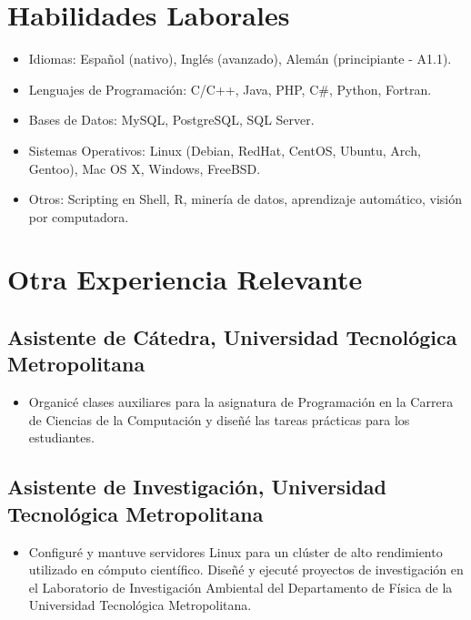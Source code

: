 \documentclass[a4paper,10pt]{article}
\begin{document}
\section*{Habilidades Laborales}
\begin{itemize}[left=0em]
    \item Idiomas: Español (nativo), Inglés (avanzado), Alemán (principiante - A1.1).
    \item Lenguajes de Programación: C/C++, Java, PHP, C#, Python, Fortran.
    \item Bases de Datos: MySQL, PostgreSQL, SQL Server.
    \item Sistemas Operativos: Linux (Debian, RedHat, CentOS, Ubuntu, Arch, Gentoo), Mac OS X, Windows, FreeBSD.
    \item Otros: Scripting en Shell, R, minería de datos, aprendizaje automático, visión por computadora.
\end{itemize}

\section*{Otra Experiencia Relevante}
\subsection*{Asistente de Cátedra, Universidad Tecnológica Metropolitana}
\begin{itemize}[left=0em]
    \item Organicé clases auxiliares para la asignatura de Programación en la Carrera de Ciencias de la Computación y diseñé las tareas prácticas para los estudiantes.
\end{itemize}

\subsection*{Asistente de Investigación, Universidad Tecnológica Metropolitana}
\begin{itemize}[left=0em]
    \item Configuré y mantuve servidores Linux para un clúster de alto rendimiento utilizado en cómputo científico. Diseñé y ejecuté proyectos de investigación en el Laboratorio de Investigación Ambiental del Departamento de Física de la Universidad Tecnológica Metropolitana.
\end{itemize}
\end{document}
